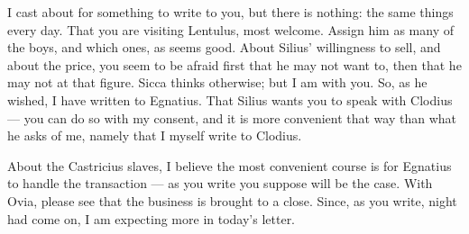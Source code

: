 

 I cast about for something to write to you, but there is nothing: the same things every day. That you are visiting Lentulus, most welcome. Assign him as many of the boys, and which ones, as seems good. About Silius' willingness to sell, and about the price, you seem to be afraid first that he may not want to, then that he may not at that figure. Sicca thinks otherwise; but I am with you. So, as he wished, I have written to Egnatius. That Silius wants you to speak with Clodius --- you can do so with my consent, and it is more convenient that way than what he asks of me, namely that I myself write to Clodius.

 About the Castricius slaves, I believe the most convenient course is for Egnatius to handle the transaction --- as you write you suppose will be the case. With Ovia, please see that the business is brought to a close. Since, as you write, night had come on, I am expecting more in today's letter.

